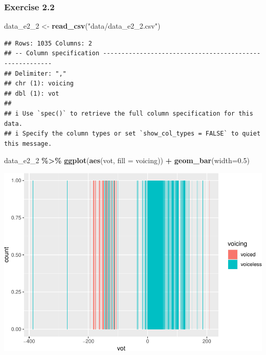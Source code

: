 \documentclass[
]{article}
\newenvironment{Shaded}{\begin{snugshade}}{\end{snugshade}}
\newcommand{\AttributeTok}[1]{\textcolor[rgb]{0.13,0.29,0.53}{#1}}
\newcommand{\FloatTok}[1]{\textcolor[rgb]{0.00,0.00,0.81}{#1}}
\newcommand{\FunctionTok}[1]{\textcolor[rgb]{0.13,0.29,0.53}{\textbf{#1}}}
\newcommand{\NormalTok}[1]{#1}
\newcommand{\OtherTok}[1]{\textcolor[rgb]{0.56,0.35,0.01}{#1}}
\newcommand{\SpecialCharTok}[1]{\textcolor[rgb]{0.81,0.36,0.00}{\textbf{#1}}}
\newcommand{\StringTok}[1]{\textcolor[rgb]{0.31,0.60,0.02}{#1}}
\begin{document}
\subsubsection{Exercise 2.2}\label{exercise-2.2}

\begin{Shaded}
\begin{Highlighting}[]
\NormalTok{data\_e2\_2 }\OtherTok{\textless{}{-}} \FunctionTok{read\_csv}\NormalTok{(}\StringTok{"data/data\_e2\_2.csv"}\NormalTok{)}
\end{Highlighting}
\end{Shaded}

\begin{verbatim}
## Rows: 1035 Columns: 2
## -- Column specification --------------------------------------------------------
## Delimiter: ","
## chr (1): voicing
## dbl (1): vot
## 
## i Use `spec()` to retrieve the full column specification for this data.
## i Specify the column types or set `show_col_types = FALSE` to quiet this message.
\end{verbatim}

\begin{Shaded}
\begin{Highlighting}[]
\NormalTok{data\_e2\_2 }\SpecialCharTok{\%\textgreater{}\%}
  \FunctionTok{ggplot}\NormalTok{(}\FunctionTok{aes}\NormalTok{(vot, }\AttributeTok{fill =}\NormalTok{ voicing)) }\SpecialCharTok{+}
  \FunctionTok{geom\_bar}\NormalTok{(}\AttributeTok{width=}\FloatTok{0.5}\NormalTok{)}
\end{Highlighting}
\end{Shaded}

\includegraphics{analysis_files/figure-latex/e2-2-1.pdf}
\end{document}
